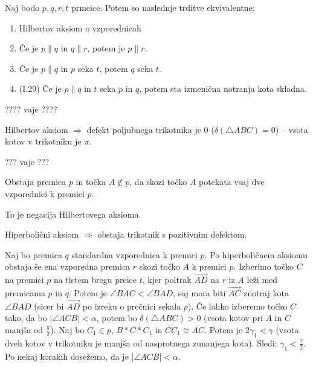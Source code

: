 \begin{izrek}
    Naj bodo $p, q, r, t$ prmeice. Potem so naslednje trditve ekvivalentne:
    \begin{enumerate}
        \item Hilbertov aksiom o vzporednicah
        \item Če je $p\parallel q$ in $q \parallel r$, potem je $p\parallel r$.
        \item Če je $p\parallel q$ in $p$ seka $t$, potem $q$ seka $t$.
        \item (I.29) Če je $p\parallel q$ in $t$ seka $p$ in $q$, potem sta izmenična notranja kota skladna.
    \end{enumerate}
\end{izrek}

    \begin{dokaz}
        ???? vaje ????
    \end{dokaz}

\begin{trditev}[I.32]
    Hilbertov aksiom $\Rightarrow$ defekt poljubnega trikotnika je $0$ ($\delta(\triangle ABC)=0$) -- vsota kotov v trikotniku je $\pi$.
\end{trditev}

    \begin{dokaz}
        ??? vaje ???
    \end{dokaz}

\begin{aksiom}
    Obstaja premica $p$ in točka $A\notin p$, da skozi točko $A$ potekata vsaj dve vzporednici k premici $p$.
\end{aksiom}

\begin{opomba}
    To je negacija Hilbertovega aksioma.
\end{opomba}

\begin{trditev}
    Hiperbolični aksiom $\Rightarrow$ obstaja trikotnik s pozitivnim defektom.
\end{trditev}

    \begin{dokaz}
        Naj bo premica $q$ standardna vzporednica k premici $p$. Po hiperboličnem aksiomu obstaja še ena vzporedna premica $r$ skozi točko $A$ k premici $p$. Izberimo točko $C$ na premici $p$ na tistem bregu preice $t$, kjer poltrak $\overrightarrow{AD}$ na $r$ iz $A$ leži med premicama $p$ in $q$. Potem je $\angle BAC<\angle BAD$, saj mora biti $\overrightarrow{AC}$ znotraj kota $\angle BAD$ (sicer bi $\overrightarrow{AD}$ po izreku o prečnici sekala $p$). Če lahko izberemo točko $C$ tako, da bo $|\angle ACB|<\alpha$, potem bo $\delta(\triangle ABC)>0$ (vsota kotov pri $A$ in $C$ manjša od $\frac{\pi}{2}$).
        Naj bo $C_1\in p$, $B\ast C\ast C_1$ in $CC_1\cong AC$. Potem je $2\gamma_1<\gamma$ (vsota dveh kotov v trikotniku je manjša od nasprotnega zunanjega kota). Sledi: $\gamma_1<\frac{\gamma}{2}$. Po nekaj korakih dosežemo, da je $|\angle ACB|<\alpha$.
    \end{dokaz}

